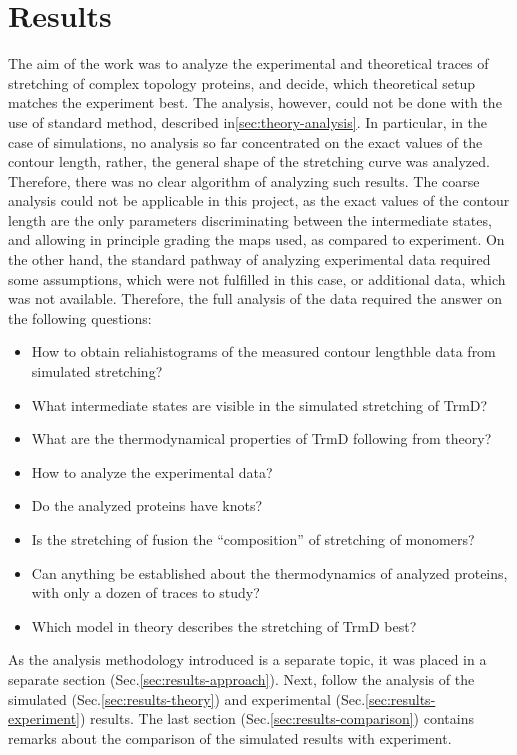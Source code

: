 \chapter{Results}
\label{ch:results}
The aim of the work was to analyze the experimental and theoretical traces of stretching of complex topology proteins, and decide, which theoretical setup matches the experiment best.
The analysis, however, could not be done with the use of standard method, described in\ref{sec:theory-analysis}.
In particular, in the case of simulations, no analysis so far concentrated on the exact values of the contour length, rather, the general shape of the stretching curve was analyzed.
Therefore, there was no clear algorithm of analyzing such results.
The coarse analysis could not be applicable in this project, as the exact values of the contour length are the only parameters discriminating between the intermediate states, and allowing in principle grading the maps used, as compared to experiment.
On the other hand, the standard pathway of analyzing experimental data required some assumptions, which were not fulfilled in this case, or additional data, which was not available.
Therefore, the full analysis of the data required the answer on the following questions:
\begin{itemize}histograms of the measured contour length
    \item How to obtain reliahistograms of the measured contour lengthble data from simulated stretching?
    \item What intermediate states are visible in the simulated stretching of TrmD?
    \item What are the thermodynamical properties of TrmD following from theory?
    \item How to analyze the experimental data?
    \item Do the analyzed proteins have knots?
    \item Is the stretching of fusion the ``composition'' of stretching of monomers?
    \item Can anything be established about the thermodynamics of analyzed proteins, with only a dozen of traces to study?
    \item Which model in theory describes the stretching of TrmD best?
\end{itemize}

As the analysis methodology introduced is a separate topic, it was placed in a separate section (Sec.\ref{sec:results-approach}).
Next, follow the analysis of the simulated (Sec.\ref{sec:results-theory}) and experimental (Sec.\ref{sec:results-experiment}) results.
The last section (Sec.\ref{sec:results-comparison}) contains remarks about the comparison of the simulated results with experiment.



